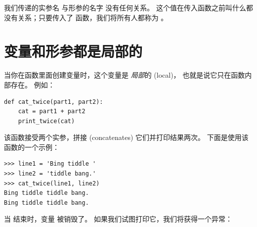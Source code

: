%

我们传递的实参名  与形参的名字  没有任何关系。 这个值在传入函数之前叫什么都没有关系；只要传入了  函数，我们将所有人都称为 。


%
\section{变量和形参都是局部的}
  
  


当你在函数里面创建变量时，这个变量是 {\em 局部}的 (local)，
也就是说它只在函数内部存在。 例如：

\begin{lstlisting}
def cat_twice(part1, part2):
    cat = part1 + part2
    print_twice(cat)
\end{lstlisting}

%

该函数接受两个实参，拼接 (concatenates) 它们并打印结果两次。 下面是使用该函数的一个示例：

\begin{lstlisting}
>>> line1 = 'Bing tiddle '
>>> line2 = 'tiddle bang.'
>>> cat_twice(line1, line2)
Bing tiddle tiddle bang.
Bing tiddle tiddle bang.
\end{lstlisting}

%

当  结束时，变量  被销毁了。
如果我们试图打印它，我们将获得一个异常：
  

